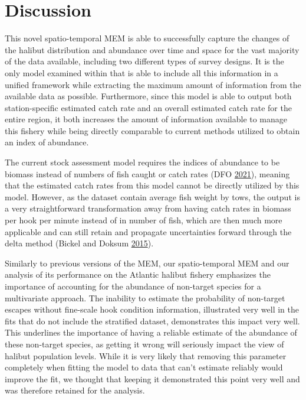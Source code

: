 \documentclass[12pt]{article}\usepackage[]{graphicx}\usepackage[]{color}
\begin{document}
\hypertarget{discussion}{%
\section{Discussion}\label{discussion}}

This novel spatio-temporal MEM is able to successfully capture the changes of the halibut distribution and abundance over time and space for the vast majority of the data available, including two different types of survey designs. It is the only model examined within that is able to include all this information in a unified framework while extracting the maximum amount of information from the available data as possible. Furthermore, since this model is able to output both station-specific estimated catch rate and an overall estimated catch rate for the entire region, it both increases the amount of information available to manage this fishery while being directly comparable to current methods utilized to obtain an index of abundance.

The current stock assessment model requires the indices of abundance to be biomass instead of numbers of fish caught or catch rates (DFO \protect\hyperlink{ref-DFO2021}{2021}), meaning that the estimated catch rates from this model cannot be directly utilized by this model. However, as the dataset contain average fish weight by tows, the output is a very straightforward transformation away from having catch rates in biomass per hook per minute instead of in number of fish, which are then much more applicable and can still retain and propagate uncertainties forward through the delta method (Bickel and Doksum \protect\hyperlink{ref-Bickel2015}{2015}).

Similarly to previous versions of the MEM, our spatio-temporal MEM and our analysis of its performance on the Atlantic halibut fishery emphasizes the importance of accounting for the abundance of non-target species for a multivariate approach. The inability to estimate the probability of non-target escapes without fine-scale hook condition information, illustrated very well in the fits that do not include the stratified dataset, demonstrates this impact very well. This underlines the importance of having a reliable estimate of the abundance of these non-target species, as getting it wrong will seriously impact the view of halibut population levels. While it is very likely that removing this parameter completely when fitting the model to data that can't estimate reliably would improve the fit, we thought that keeping it demonstrated this point very well and was therefore retained for the analysis.
\end{document}
